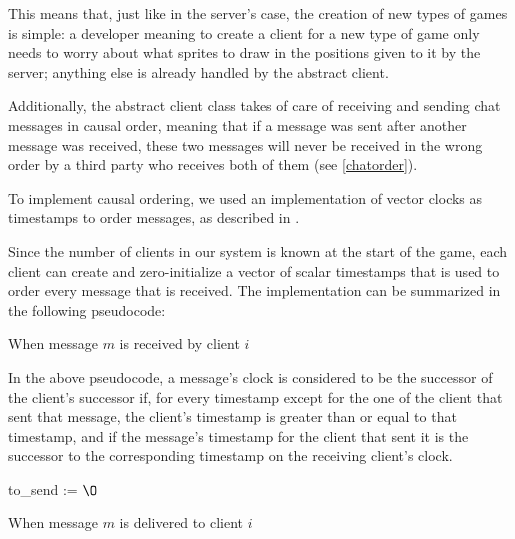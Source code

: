 \documentclass[times, 10pt,twocolumn]{article}
\begin{document}
This means that, just like in the server's case, the creation of new types
of games is simple: a developer meaning to create a client for a new type
of game only needs to worry about what sprites to draw in the positions
given to it by the server; anything else is already handled by the abstract
client.

Additionally, the abstract client class takes of care of receiving and sending
chat messages in causal order, meaning that if a message was sent after another
message was received, these two messages will never be received in the wrong
order by a third party who receives both of them (see \ref{chatorder}).


\label{chatorder}

To implement causal ordering, we used an implementation of vector clocks as
timestamps to order messages, as described in \cite{timestamps}.

Since the number of clients in our system is known at the start of the game,
each client can create and zero-initialize a vector of scalar timestamps that
is used to order every message that is received. The implementation can be
summarized in the following pseudocode:

\begin{algorithm}[h]

  \caption{When message $m$ is received by client $i$}
\end{algorithm}

In the above pseudocode, a message's clock is considered to be
the successor of the client's successor if, for every timestamp except
for the one of the client that sent that message, the client's timestamp is
greater than or equal to that timestamp, and if the message's timestamp
for the client that sent it is the successor to the corresponding timestamp
on the receiving client's clock.

\begin{algorithm}[h]
  \;
  to\_send := $\O$\;

  \caption{When message $m$ is delivered to client $i$}
\end{algorithm}
\end{document}
